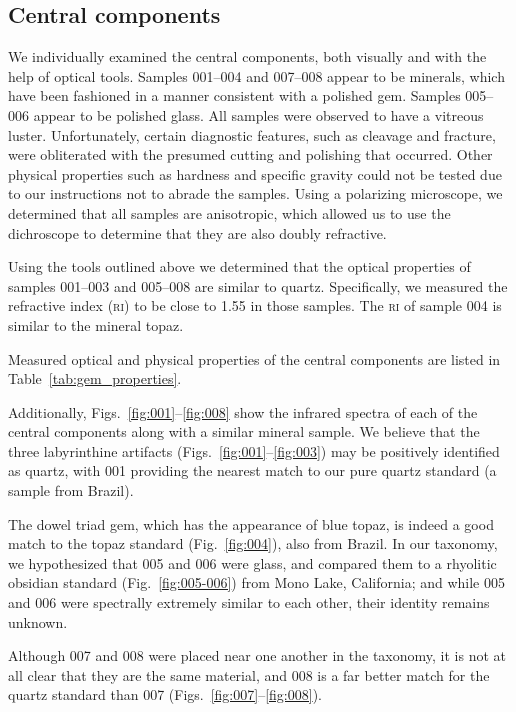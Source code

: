 \documentclass[10pt,twoside,openany]{article}
\theoremstyle{definition}
\begin{document}
\subsection{Central components}
We individually examined the central components, both visually and with the help of optical tools.
Samples 001--004 and 007--008 appear to be minerals, which have been fashioned in a manner consistent with a polished gem.
Samples 005--006 appear to be polished glass.
All samples were observed to have a vitreous luster.
Unfortunately, certain diagnostic features, such as cleavage and fracture, were obliterated with the presumed cutting and polishing that occurred.
Other physical properties such as hardness and specific gravity could not be tested due to our instructions not to abrade the samples.
Using a polarizing microscope, we determined that all samples are anisotropic, which allowed us to use the dichroscope to determine that they are also doubly refractive.

Using the tools outlined above we determined that the optical properties of samples 001--003 and 005--008 are similar to quartz.
Specifically, we measured the refractive index (\textsc{ri}) to be close to 1.55 in those samples.
The \textsc{ri} of sample 004 is similar to the mineral topaz.

Measured optical and physical properties of the central components are listed in Table~\ref{tab:gem_properties}.

Additionally, Figs.~\ref{fig:001}--\ref{fig:008} show the infrared spectra of each of the central components along with a similar mineral sample.
We believe that the three labyrinthine artifacts (Figs.~\ref{fig:001}--\ref{fig:003}) may be positively identified as quartz, with 001 providing the nearest match to our pure quartz standard (a sample from Brazil).

The dowel triad gem, which has the appearance of blue topaz, is indeed a good match to the topaz standard (Fig.~\ref{fig:004}), also from Brazil.
In our taxonomy, we hypothesized that 005 and 006 were glass, and compared them to a rhyolitic obsidian standard (Fig.~\ref{fig:005-006}) from Mono Lake, California; and while 005 and 006 were spectrally extremely similar to each other, their identity remains unknown.

Although 007 and 008 were placed near one another in the taxonomy, it is not at all clear that they are the same material, and 008 is a far better match for the quartz standard than 007 (Figs.~\ref{fig:007}--\ref{fig:008}).
\end{document}
